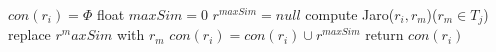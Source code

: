\documentclass[UTF8]{article}
\begin{document}
\begin{algorithm}
$con(r_i)= \Phi$\;
{
 float $maxSim=0$\;
 $r^{maxSim}=null$\;
 {
    compute Jaro($r_i,r_m$)($r_m \in T_j$)\;
     {
          replace $r^maxSim$ with $r_m$\;
     }
 }
$con(r_i)=con(r_i) \cup {r^{maxSim}}$\;
}
return $con(r_i)$\;
\end{algorithm}
\end{document}
